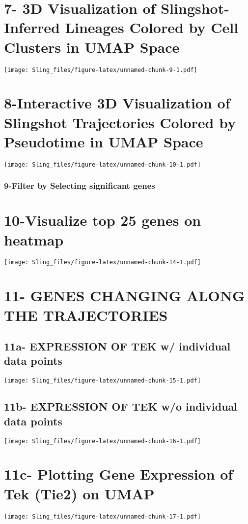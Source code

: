\documentclass[
]{article}
\begin{document}
\section{7- 3D Visualization of Slingshot-Inferred Lineages Colored by
Cell Clusters in UMAP
Space}\label{d-visualization-of-slingshot-inferred-lineages-colored-by-cell-clusters-in-umap-space}

\texttt{[image: Sling\_files/figure-latex/unnamed-chunk-9-1.pdf]}

\section{8-Interactive 3D Visualization of Slingshot Trajectories
Colored by Pseudotime in UMAP
Space}\label{interactive-3d-visualization-of-slingshot-trajectories-colored-by-pseudotime-in-umap-space}

\texttt{[image: Sling\_files/figure-latex/unnamed-chunk-10-1.pdf]}

\subsubsection{9-Filter by Selecting significant
genes}\label{filter-by-selecting-significant-genes}

\section{10-Visualize top 25 genes on
heatmap}\label{visualize-top-25-genes-on-heatmap}

\texttt{[image: Sling\_files/figure-latex/unnamed-chunk-14-1.pdf]}

\section{11- GENES CHANGING ALONG THE
TRAJECTORIES}\label{genes-changing-along-the-trajectories}

\subsection{11a- EXPRESSION OF TEK w/ individual data
points}\label{a--expression-of-tek-w-individual-data-points}

\texttt{[image: Sling\_files/figure-latex/unnamed-chunk-15-1.pdf]}

\subsection{11b- EXPRESSION OF TEK w/o individual data
points}\label{b--expression-of-tek-wo-individual-data-points}

\texttt{[image: Sling\_files/figure-latex/unnamed-chunk-16-1.pdf]}

\section{11c- Plotting Gene Expression of Tek (Tie2) on
UMAP}\label{c--plotting-gene-expression-of-tek-tie2-on-umap}

\texttt{[image: Sling\_files/figure-latex/unnamed-chunk-17-1.pdf]}
\end{document}
